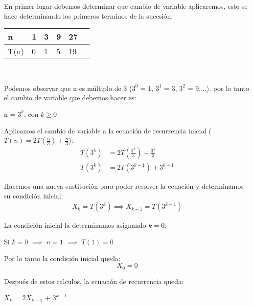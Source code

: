 \begin{solution}
  En primer lugar debemos determinar que cambio de variable aplicaremos, esto se hace determinando los primeros terminos de la sucesión:
  \begin{center}
    \begin{tabular}{@{}llllll@{}}
        \toprule
        n & 1 & 3 & 9 & 27 \\ \midrule
        T(n) & 0 & 1 & 5 & 19 \\ 
        \bottomrule
    \end{tabular}\\
  \end{center}
  
  Podemos observar que n es múltiplo de 3 ($3^0$ = 1, $3^1$ = 3, $3^2$ = 9,...), por lo tanto el cambio de variable que debemos hacer es:
  \begin{center}
      n = $3^k$, con $k \ge 0$
  \end{center}
  
  Aplicamos el cambio de variable a la ecuación de recurrencia inicial ($T(n) = 2T\left(\frac{n}{3}\right) + \frac{n}{3}$):
  \begin{align*}
      T(3^k) &= 2T\left(\frac{3^k}{3}\right) + \frac{3^k}{3}\\
      T(3^k) &= 2T(3^{k-1}) + 3^{k-1}
  \end{align*}

  Hacemos una nueva sustitución para poder resolver la ecuación y determinamos su condición inicial:    
  \begin{align*}
      X_k = T(3^k) \implies X_{k-1} = T(3^{k-1})
  \end{align*}
  \begin{center}
      La condición inicial la determinamos asignando $k = 0$:
      
      Si $k = 0$ $\implies$ $n = 1$ $\implies$ $T(1) = 0$
      
      Por lo tanto la condición inicial queda:
      $$X_0 = 0$$
  \end{center}
  
  Después de estos calculos, la ecuación de recurrencia queda:
  \begin{center}
      $X_k$ = 2$X_{k-1}$ + $3^{k-1}$
      

\end{center}
\end{solution}

